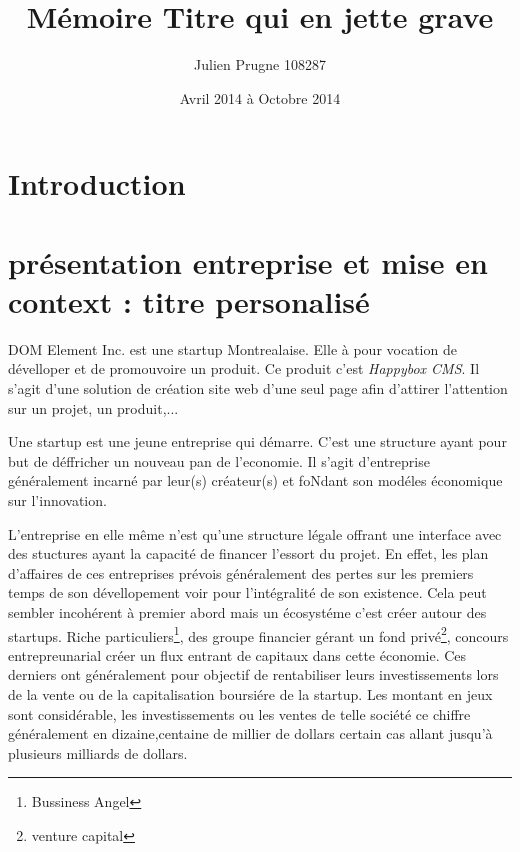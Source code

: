 \documentclass[11pt, a4paper ]{report}
\title{Mémoire Titre qui en jette grave}
\author{Julien Prugne 108287}
\date{Avril 2014 à Octobre 2014}
\begin{document}
	\maketitle
	\tableofcontents

	\chapter*{Introduction} %

	\chapter{présentation entreprise et mise en context : titre personalisé} %

DOM Element Inc. est une startup Montrealaise. Elle à pour vocation de dévelloper et de promouvoire un produit. Ce produit c'est \emph{Happybox CMS}. Il s'agit d'une solution de création site web d'une seul page afin d'attirer l'attention sur un projet, un produit,...

Une startup\cite{theseStartup} est une jeune entreprise qui démarre. C'est une structure ayant pour but de déffricher un nouveau pan de l'economie. Il s'agit d'entreprise généralement incarné par leur(s) créateur(s) et foNdant son modéles économique sur l'innovation. 

L'entreprise en elle même n'est qu'une structure légale offrant une interface avec des stuctures ayant la capacité de financer l'essort du projet. En effet, les plan d'affaires de ces entreprises prévois généralement des pertes sur les premiers temps de son dévellopement voir pour l'intégralité de son existence. Cela peut sembler incohérent à premier abord mais un écosystéme c'est créer autour des startups. Riche particuliers\footnote{Bussiness Angel}, des groupe financier gérant un fond privé\footnote{venture capital}, concours entrepreunarial créer un flux entrant de capitaux dans cette économie. Ces derniers ont généralement pour objectif de rentabiliser leurs investissements lors de la vente ou de la capitalisation boursiére de la startup. Les montant en jeux sont considérable, les investissements ou les ventes de telle société ce chiffre généralement en dizaine,centaine de millier de dollars certain cas allant jusqu'à plusieurs milliards de dollars.
\end{document}
